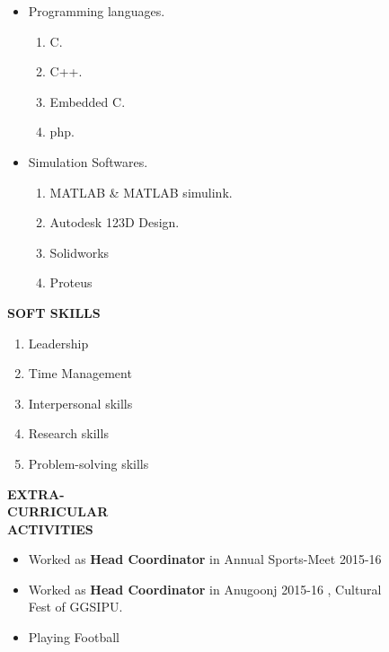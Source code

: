 \documentclass[11pt]{article}
\begin{document}
\begin{itemize}
\vspace{-0.72in}	                                     		\addtolength{\itemindent}{1.3in}	                                     \item Programming languages.
{\begin{enumerate}
\addtolength{\itemindent}{1.359in}                             		\item C.
\item C++.
\item Embedded C.
\item php.
\end{enumerate}
}
\item  Simulation Softwares.
{\begin{enumerate}
\addtolength{\itemindent}{1.359in}                             		\item MATLAB \& MATLAB simulink.
\item Autodesk 123D Design.
\item Solidworks 
\item Proteus
\end{enumerate}
}
\end{itemize}

\begin{flushleft}
{\Large \textbf{SOFT SKILLS}}
\begin{flushright} 
\begin{enumerate}
\addtolength{\itemindent}{1.55in} 
\vspace{-0.32in} 
\item Leadership
\item Time Management	
\item Interpersonal skills
\item Research skills 
\item Problem-solving skills
\end{enumerate} 
\end{flushright}
\end{flushleft}	

\begin{flushleft}

{\large \bf{EXTRA-\\ CURRICULAR\\ ACTIVITIES}}
\begin{itemize}
\addtolength{\itemindent}{1.5in}
\vspace{-0.70in} 
\item Worked as {\bf Head Coordinator} in Annual Sports-Meet 2015-16 
\item Worked as {\bf Head Coordinator} in Anugoonj 2015-16 , Cultural\\ \hspace{1.47in} Fest of GGSIPU.
\item Playing Football
\end{itemize}
\end{flushleft}                                    		
\end{document}

